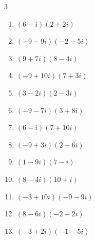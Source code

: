 \begin{multicols}{3}
\begin{enumerate}
        \phantom{$\displaystyle =4-12i$}

\columnbreak %

  \item $\displaystyle (6-i)(2+2i)$

        \phantom{$\displaystyle =14+10i$}

  \item $\displaystyle (-9-9i)(-2-5i)$

        \phantom{$\displaystyle =-27+63i$}

  \item $\displaystyle (9+7i)(8-4i)$

        \phantom{$\displaystyle =100+20i$}

  \item $\displaystyle (-9+10i)(7+3i)$

        \phantom{$\displaystyle =-93+43i$}

  \item $\displaystyle (3-2i)(2-3i)$

        \phantom{$\displaystyle =-13i$}

  \item $\displaystyle (-9-7i)(3+8i)$

        \phantom{$\displaystyle =29-93i$}

  \item $\displaystyle (6-i)(7+10i)$

        \phantom{$\displaystyle =52+53i$}

  \item $\displaystyle (-9+3i)(2-6i)$

        \phantom{$\displaystyle =60i$}

  \item $\displaystyle (1-9i)(7-i)$

        \phantom{$\displaystyle =-2-64i$}

  \item $\displaystyle (8-4i)(10+i)$

        \phantom{$\displaystyle =84-32i$}

  \item $\displaystyle (-3+10i)(-9-9i)$

        \phantom{$\displaystyle =117-63i$}

  \item $\displaystyle (8-6i)(-2-2i)$

        \phantom{$\displaystyle =-28-4i$}

  \item $\displaystyle (-3+2i)(-1-5i)$


\end{enumerate}
\end{multicols}
